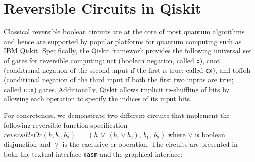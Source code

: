 \section{Reversible Circuits in Qiskit}
\label{sec:qiskit}
\label{sec:examples}

Classical reversible boolean circuits are at the core of most quantum algorithms and
hence are supported by popular platforms for quantum computing such as IBM
Qiskit. Specifically, the Qiskit framework provides the following universal set
of gates for reversible computing: \textsf{not} (boolean negation, called
\verb|x|), \textsf{cnot} (conditional negation of the second input if the first
is true; called \verb|cx|), and \textsf{toffoli} (conditional negation of the
third input if both the first two inputs are true; called \verb|ccx|)
gates. Additionally, Qiskit allows implicit re-shuffling of bits by allowing
each operation to specify the indices of its input bits.

For concreteness, we demonstrate two different circuits that implement the
following reversible function specification
$\mathit{reversibleOr}(h,b_1,b_2) ~=~ (h \,\underline{\vee}\, (b_1 \vee b_2),
~b_1, ~b_2)$ where $\vee$ is boolean disjunction and $\underline{\vee}$ is the
exclusive-or operation. The circuits are presented in both the textual interface
\verb|qasm| and the graphical interface:

